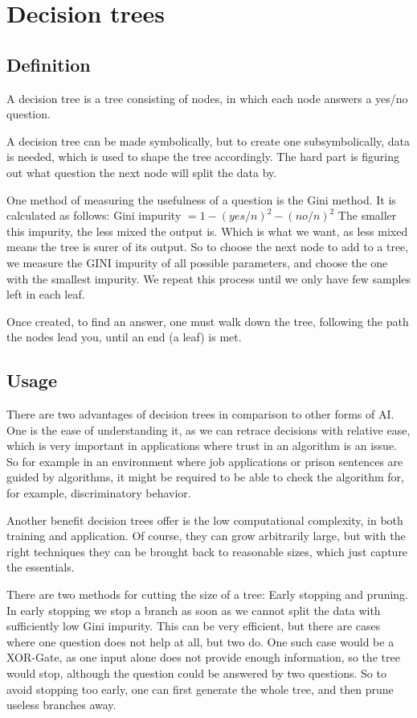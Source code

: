 \section{Decision trees}
\label{sec:decisionTrees}
\subsection{Definition}

A decision tree is a tree consisting of nodes, in which each node answers a yes/no question. 

A decision tree can be made symbolically, but to create one subsymbolically, data is needed, which is used to shape the tree accordingly.
The hard part is figuring out what question the next node will split the data by. 

One method of measuring the usefulness of a question is the Gini method.
It is calculated as follows: Gini impurity $= 1-(yes/n)^2-(no/n)^2$
The smaller this impurity, the less mixed the output is. Which is what we want, as less mixed means the tree is surer of its output. 
So to choose the next node to add to a tree, we measure the GINI impurity of all possible parameters, and choose the one with the smallest impurity. We repeat this process until we only have few samples left in each leaf. %

Once created, to find an answer, one must walk down the tree, following the path the nodes lead you, until an end (a leaf) is met.

\subsection{Usage}
There are two advantages of decision trees in comparison to other forms of AI. One is the ease of understanding it, as we can retrace decisions with relative ease, which is very important in applications where trust in an algorithm is an issue. So for example in an environment where job applications or prison sentences are guided by algorithms, it might be required to be able to check the algorithm for, for example, discriminatory behavior.

Another benefit decision trees offer is the low computational complexity, in both training and application. Of course, they can grow arbitrarily large, but with the right techniques they can be brought back to reasonable sizes, which just capture the essentials.

There are two methods for cutting the size of a tree: Early stopping and pruning. In early stopping we stop a branch as soon as we cannot split the data with sufficiently low Gini impurity. This can be very efficient, but there are cases where one question does not help at all, but two do. One such case would be a XOR-Gate, as one input alone does not provide enough information, so the tree would stop, although the question could be answered by two questions.
So to avoid stopping too early, one can first generate the whole tree, and then prune useless branches away.

